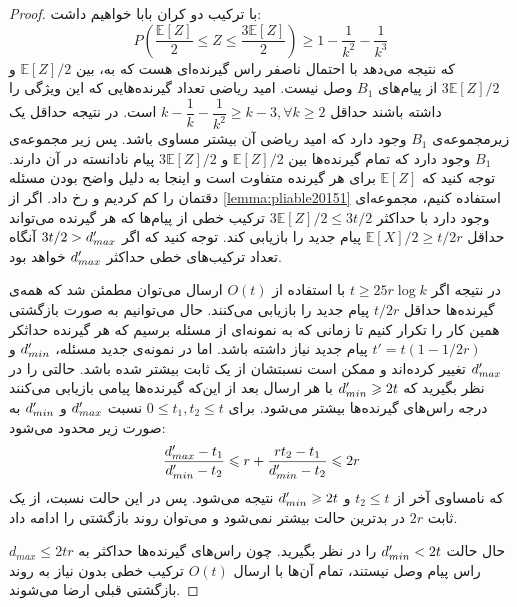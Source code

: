 \begin{proof}
	با ترکیب دو کران بابا خواهیم داشت:
	\begin{equation}
		P(\dfrac{\mathbb{E}[Z]}{2} \leq Z \leq \dfrac{3\mathbb{E}[Z]}{2}) \geq 1 - \dfrac{1}{k^2} - \dfrac{1}{k^3}
	\end{equation}
	که نتیجه می‌دهد با احتمال ناصفر راس گیرنده‌ای هست که به، بین
	$\mathbb{E}[Z]/2$
	و
	$3\mathbb{E}[Z]/2$
	از پیام‌های
	$B_1$
	وصل نیست. امید ریاضی تعداد گیرنده‌هایی که این ویژگی را داشته باشند حداقل
	$k - \dfrac{1}{k} - \dfrac{1}{k^2} \geq k - 3, \forall k \geq 2$
	است. در نتیجه حداقل یک زیرمجموعه‌ی
	$B_1$
	وجود دارد که امید ریاضی آن بیشتر مساوی باشد. پس زیر مجموعه‌ی
	$B_1$
	وجود دارد که تمام گیرنده‌ها بین
	$\mathbb{E}[Z] / 2$
	و
	$3\mathbb{E}[Z]/2$
	پیام نادانسته در آن دارند. توجه کنید که
	$\mathbb{E}[Z]$
	برای هر گیرنده متفاوت است و اینجا به دلیل واضح بودن مسئله دقتمان را کم کردیم و
	رخ داد. اگر از 
	\autoref{lemma:pliable20151}
	استفاده کنیم، مجموعه‌ای وجود دارد با حداکثر
	$3\mathbb{E}[Z]/2 \leq 3t/2$
	ترکیب خطی از پیام‌ها که هر گیرنده می‌تواند حداقل
	$\mathbb{E}[X]/2 \geq t/2r$
	پیام جدید را بازیابی کند. توجه کنید که اگر
	$3t/2 > d_{max}'$
	آنگاه تعداد ترکیب‌های خطی حداکثر
	$d_{max}'$
	خواهد بود.
	
	در نتیجه اگر
	$t \geq 25 r \log k$
	با استفاده از
	$O(t)$
	ارسال می‌توان مطمئن شد که همه‌ی گیرنده‌ها حداقل
	$t/2r$
	پیام جدید را بازیابی می‌کنند. حال می‌توانیم به صورت بازگشتی همین کار را تکرار کنیم تا زمانی که به نمونه‌ای از مسئله برسیم که هر گیرنده حداثکر
	$t' = t(1 - 1/2r)$
	پیام جدید نیاز داشته باشد. اما در نمونه‌ی جدید مسئله،
	$d_{min}'$
	و
	$d_{max}'$
	تغییر کرده‌اند و ممکن است نسبتشان از یک ثابت بیشتر شده باشد. حالتی را در نظر بگیرید که
	$d_{min}' \geqslant 2t$
	با هر ارسال بعد از این‌که گیرنده‌ها پیامی بازیابی می‌کنند درجه راس‌های گیرنده‌ها بیشتر می‌شود. برای
	$0 \leq t_1, t_2 \leq t$
	نسبت
	$d_{max}'$
	و
	$d_{min}'$
	به صورت زیر محدود می‌شود:
	\begin{equation}
		\dfrac{d_{max}' - t_1}{d_{min}' - t_2} \leqslant r + \dfrac{rt_2 - t_1}{d_{min}' - t_2} \leqslant 2r
	\end{equation}
	که نامساوی آخر از 
	$t_2 \leq t$
	و
	$d_{min}' \geqslant 2t$
	نتیجه می‌شود. پس در این حالت نسبت، از یک ثابت
	$2r$
	در بدترین حالت بیشتر نمی‌شود و می‌توان روند بازگشتی را ادامه داد.
	
	حال حالت
	$d_{min}' < 2t$
	را در نظر بگیرید. چون راس‌های گیرنده‌ها حداکثر به
	$d_{max} \leq 2tr$
	راس پیام وصل نیستند، تمام آن‌ها با ارسال
	$O(t)$
	ترکیب خطی بدون نیاز به روند بازگشتی قبلی ارضا می‌شوند.
	

\end{proof}
